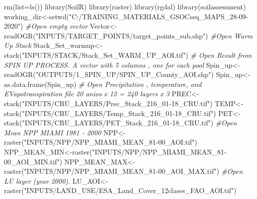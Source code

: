 \documentclass[
  10pt,
  b5paper,
]{book}
\newenvironment{Shaded}{\begin{snugshade}}{\end{snugshade}}
\newcommand{\AttributeTok}[1]{\textcolor[rgb]{0.77,0.63,0.00}{#1}}
\newcommand{\CommentTok}[1]{\textcolor[rgb]{0.56,0.35,0.01}{\textit{#1}}}
\newcommand{\FunctionTok}[1]{\textcolor[rgb]{0.00,0.00,0.00}{#1}}
\newcommand{\NormalTok}[1]{#1}
\newcommand{\OtherTok}[1]{\textcolor[rgb]{0.56,0.35,0.01}{#1}}
\newcommand{\StringTok}[1]{\textcolor[rgb]{0.31,0.60,0.02}{#1}}
\begin{document}
\begin{Shaded}
\begin{Highlighting}[]
\FunctionTok{rm}\NormalTok{(}\AttributeTok{list=}\FunctionTok{ls}\NormalTok{()) }
\FunctionTok{library}\NormalTok{(SoilR)}
\FunctionTok{library}\NormalTok{(raster)}
\FunctionTok{library}\NormalTok{(rgdal)}
\FunctionTok{library}\NormalTok{(soilassessment)}
\NormalTok{working\_dir}\OtherTok{\textless{}{-}}\FunctionTok{setwd}\NormalTok{(}\StringTok{"C:/TRAINING\_MATERIALS\_GSOCseq\_MAPS\_28{-}09{-}2020"}\NormalTok{)}
\CommentTok{\#Open empty vector}
\NormalTok{Vector}\OtherTok{\textless{}{-}}\FunctionTok{readOGR}\NormalTok{(}\StringTok{"INPUTS/TARGET\_POINTS/target\_points\_sub.shp"}\NormalTok{)}
\CommentTok{\#Open Warm Up Stack}
\NormalTok{Stack\_Set\_warmup}\OtherTok{\textless{}{-}} \FunctionTok{stack}\NormalTok{(}\StringTok{"INPUTS/STACK/Stack\_Set\_WARM\_UP\_AOI.tif"}\NormalTok{)}
\CommentTok{\# Open Result from SPIN UP PROCESS. A vector with 5 columns , one for each pool}
\NormalTok{Spin\_up}\OtherTok{\textless{}{-}}\FunctionTok{readOGR}\NormalTok{(}\StringTok{"OUTPUTS/1\_SPIN\_UP/SPIN\_UP\_County\_AOI.shp"}\NormalTok{)}
\NormalTok{Spin\_up}\OtherTok{\textless{}{-}}\FunctionTok{as.data.frame}\NormalTok{(Spin\_up)}
\CommentTok{\# Open Precipitation , temperature, and EVapotranspiration file 20 anios x 12 = 240 layers x 3}
\NormalTok{PREC}\OtherTok{\textless{}{-}}\FunctionTok{stack}\NormalTok{(}\StringTok{"INPUTS/CRU\_LAYERS/Prec\_Stack\_216\_01{-}18\_CRU.tif"}\NormalTok{)}
\NormalTok{TEMP}\OtherTok{\textless{}{-}}\FunctionTok{stack}\NormalTok{(}\StringTok{"INPUTS/CRU\_LAYERS/Temp\_Stack\_216\_01{-}18\_CRU.tif"}\NormalTok{)}
\NormalTok{PET}\OtherTok{\textless{}{-}}\FunctionTok{stack}\NormalTok{(}\StringTok{"INPUTS/CRU\_LAYERS/PET\_Stack\_216\_01{-}18\_CRU.tif"}\NormalTok{)}
\CommentTok{\#Open Mean NPP MIAMI 1981 {-} 2000}
\NormalTok{NPP}\OtherTok{\textless{}{-}}\FunctionTok{raster}\NormalTok{(}\StringTok{"INPUTS/NPP/NPP\_MIAMI\_MEAN\_81{-}00\_AOI.tif"}\NormalTok{)}
\NormalTok{NPP\_MEAN\_MIN}\OtherTok{\textless{}{-}}\FunctionTok{raster}\NormalTok{(}\StringTok{"INPUTS/NPP/NPP\_MIAMI\_MEAN\_81{-}00\_AOI\_MIN.tif"}\NormalTok{)}
\NormalTok{NPP\_MEAN\_MAX}\OtherTok{\textless{}{-}}\FunctionTok{raster}\NormalTok{(}\StringTok{"INPUTS/NPP/NPP\_MIAMI\_MEAN\_81{-}00\_AOI\_MAX.tif"}\NormalTok{)}
\CommentTok{\#Open LU layer (year 2000).}
\NormalTok{LU\_AOI}\OtherTok{\textless{}{-}}\FunctionTok{raster}\NormalTok{(}\StringTok{"INPUTS/LAND\_USE/ESA\_Land\_Cover\_12clases\_FAO\_AOI.tif"}\NormalTok{)}
\end{Highlighting}
\end{Shaded}
\end{document}
